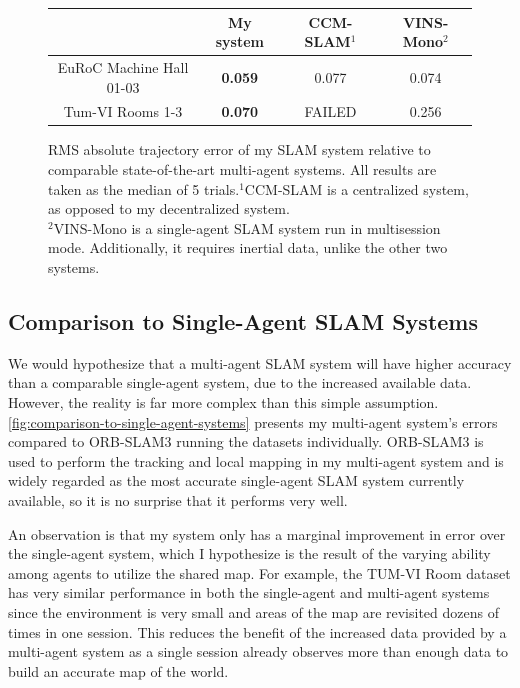 \begin{figure}[h]
    \centering
    \def\arraystretch{1.2}
    \begin{tabular}{ |c|c|c|c| }
        \cline{2-4}
        \multicolumn{1}{c|}{}    & My system      & CCM-SLAM$^1$ & VINS-Mono$^2$ \\
        \hline
        EuRoC Machine Hall 01-03 & \textbf{0.059} & 0.077        & 0.074         \\
        \hline
        Tum-VI Rooms 1-3         & \textbf{0.070} & FAILED       & 0.256         \\
        \hline
    \end{tabular}

    \caption{RMS absolute trajectory error of my SLAM system relative to comparable state-of-the-art multi-agent systems. All results are taken as the median of 5 trials.\captionbreak $^1$CCM-SLAM is a centralized system, as opposed to my decentralized system. \\ $^2$VINS-Mono is a single-agent SLAM system run in multisession mode. Additionally, it requires inertial data, unlike the other two systems.}
    \label{fig:comparison-to-multi-agent-systems}
\end{figure}

\subsection{Comparison to Single-Agent SLAM Systems}
We would hypothesize that a multi-agent SLAM system will have higher accuracy than a comparable single-agent system, due to the increased available data. However, the reality is far more complex than this simple assumption. \autoref{fig:comparison-to-single-agent-systems} presents my multi-agent system's errors compared to ORB-SLAM3 running the datasets individually. ORB-SLAM3 is used to perform the tracking and local mapping in my multi-agent system and is widely regarded as the most accurate single-agent SLAM system currently available, so it is no surprise that it performs very well.

An observation is that my system only has a marginal improvement in error over the single-agent system, which I hypothesize is the result of the varying ability among agents to utilize the shared map. For example, the TUM-VI Room dataset has very similar performance in both the single-agent and multi-agent systems since the environment is very small and areas of the map are revisited dozens of times in one session. This reduces the benefit of the increased data provided by a multi-agent system as a single session already observes more than enough data to build an accurate map of the world.

